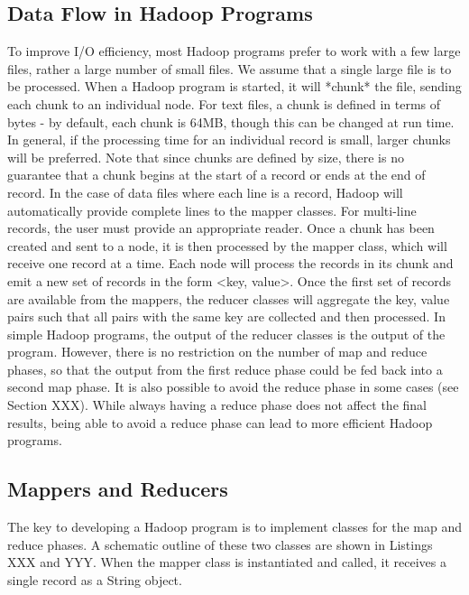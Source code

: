 \documentclass[10pt]{bmc_article}
\newenvironment{bmcformat}{\begin{raggedright}\baselineskip20pt\sloppy\setboolean{publ}{false}}{\end{raggedright}\baselineskip20pt\sloppy}
\begin{document}
\begin{bmcformat}
\subsection*{Data Flow in Hadoop Programs}
\label{sec:data-flow-hadoop}
To improve I/O efficiency, most Hadoop programs prefer to work with a
few large files, rather a large number of small files. We assume that
a single large file is to be processed. When a Hadoop program is
started, it will *chunk* the file, sending each chunk to an individual
node. For text files, a chunk is defined in terms of bytes - by
default, each chunk is 64MB, though this can be changed at run
time. In general, if the processing time for an individual record is
small, larger chunks will be preferred.  Note that since chunks are
defined by size, there is no guarantee that a chunk begins at the
start of a record or ends at the end of record. In the case of data
files where each line is a record, Hadoop will automatically provide
complete lines to the mapper classes. For multi-line records, the user
must provide an appropriate reader. Once a chunk has been created and
sent to a node, it is then processed by the mapper class, which will
receive one record at a time. Each node will process the records in
its chunk and emit a new set of records in the form <key, value>. Once
the first set of records are available from the mappers, the reducer
classes will aggregate the key, value pairs such that all pairs with
the same key are collected and then processed. In simple Hadoop
programs, the output of the reducer classes is the output of the
program. However, there is no restriction on the number of map and
reduce phases, so that the output from the first reduce phase could be
fed back into a second map phase. It is also possible to avoid the
reduce phase in some cases (see Section XXX). While always having a
reduce phase does not affect the final results, being able to avoid a
reduce phase can lead to more efficient Hadoop programs.

\subsection*{Mappers and Reducers}
\label{sec:mappers-reducers-1}

The key to developing a Hadoop program is to implement classes for the
map and reduce phases.  A schematic outline of these two classes are
shown in Listings XXX and YYY. When the mapper class is instantiated
and called, it receives a single record as a String object.



\end{bmcformat}
\end{document}
